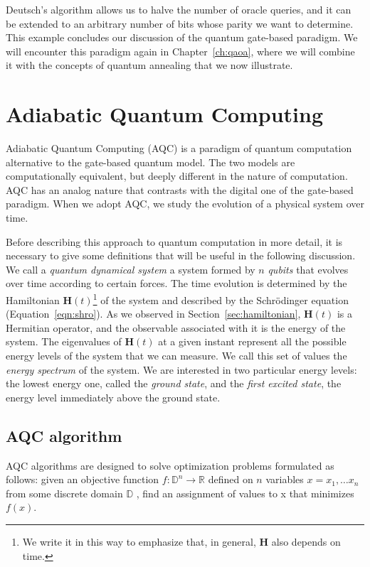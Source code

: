 Deutsch's algorithm allows us to halve the number of oracle queries, and it can be extended to an arbitrary number of bits whose parity we want to determine. This example concludes our discussion of the quantum gate-based paradigm. We will encounter this paradigm again in Chapter~\ref{ch:qaoa}, where we will combine it with the concepts of quantum annealing that we now illustrate.

\section{Adiabatic Quantum Computing}
Adiabatic Quantum Computing (AQC) is a paradigm of quantum computation alternative to the gate-based quantum model. The two models are computationally equivalent, but deeply different in the nature of computation. AQC has an analog nature that contrasts with the digital one of the gate-based paradigm. When we adopt AQC, we study the evolution of a physical system over time. 

Before describing this approach to quantum computation in more detail, it is necessary to give some definitions that will be useful in the following discussion. We call a \emph{quantum dynamical system} a system formed by $n$ \emph{qubits} that evolves over time according to certain forces. The time evolution is determined by the Hamiltonian $\mathbf{H}(t)$\footnote{We write it in this way to emphasize that, in general, $\mathbf{H}$ also depends on time.} of the system and described by the Schrödinger equation (Equation~\ref{eqn:shro}). As we observed in Section~\ref{sec:hamiltonian}, $\mathbf{H}(t)$ is a Hermitian operator, and the observable associated with it is the energy of the system. The eigenvalues of $\mathbf{H}(t)$ at a given instant represent all the possible energy levels of the system that we can measure. We call this set of values the \emph{energy spectrum} of the system. We are interested in two particular energy levels: the lowest energy one, called the \emph{ground state}, and the \emph{ﬁrst excited state}, the energy level immediately above the ground state.

\subsection{AQC algorithm}
\label{sec:qac}
AQC algorithms are designed to solve optimization problems formulated as follows: given an objective function $f: \mathbb{D}^n\rightarrow\mathbb{R}$ deﬁned on $n$ variables $x = x_1, \dots x_n$ from some discrete domain
$\mathbb{D}$ , ﬁnd an assignment of values to x that minimizes $f(x)$.

